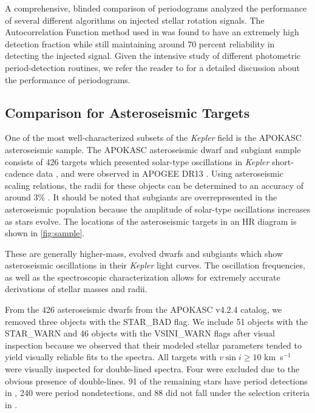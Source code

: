 \documentclass[manuscript]{aastex6}
\newcommand{\vsini}{\ensuremath{v \sin i}}
\newcommand{\Kepler}{\mbox{\textit{Kepler}}}
\newcommand{\kms}{\textrm{ km~s}\ensuremath{^{-1}}}
\begin{document}
A comprehensive, blinded comparison of periodograms analyzed the performance of
several different algorithms on injected stellar rotation \citep{Aigrain15} 
signals. The Autocorrelation Function method used in \citet{McQuillan14} was 
found to have an extremely high detection fraction while still maintaining 
around 70 percent reliability in detecting the injected signal. Given the 
intensive study of different photometric period-detection routines, we refer 
the reader to \citet{Aigrain15} for a detailed discussion about the 
performance of periodograms.

\subsection{Comparison for Asteroseismic Targets}
\label{sec:astero}


One of the most well-characterized subsets of the \Kepler{} field is the
APOKASC asteroseismic sample. The APOKASC asteroseismic dwarf and subgiant 
sample consists of 426 targets which presented solar-type oscillations in 
\Kepler{} short-cadence data \citep{Chaplin11}, and were observed in APOGEE DR13
\citep{Majewski17}. Using asteroseismic scaling relations, the radii
for these objects can be determined to an accuracy of around 3\%
\citep{Serenelli17}. It should be noted that subgiants are overrepresented in
the asteroseismic population because the amplitude of solar-type oscillations 
increases as stars evolve. The locations of the asteroseismic targets in an HR
diagram is shown in \cref{fig:sample}.

These are generally higher-mass, evolved dwarfs
and subgiants which show asteroseismic oscillations in their \Kepler{} light
curves. The oscillation frequencies, as well as the spectroscopic
characterization allows for extremely accurate derivations of stellar masses
and radii.

From the 426 asteroseismic dwarfs from the APOKASC v4.2.4 catalog, we removed 
three objects with the STAR\_BAD flag. We include 51 objects with 
the STAR\_WARN and 46 objects with the VSINI\_WARN flags after visual 
inspection because we observed that their modeled stellar parameters tended to
yield visually reliable fits to the spectra.  All targets with \(\vsini \ge
10\) \kms{} were visually
inspected for double-lined spectra. Four were excluded due to the obvious
presence of double-lines. 91 of the remaining stars have period detections in 
\citet{McQuillan14}, 240 were period nondetections, and 88 did not fall under 
the selection criteria in \citet{McQuillan14}. 
\end{document}
